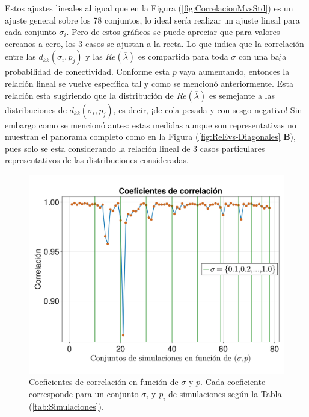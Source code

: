 \documentclass[a4paper,11pt]{book}
\theoremstyle{plain}
\theoremstyle{definition}
\begin{document}
Estos ajustes lineales al igual que en la Figura (\ref{fig:CorrelacionMvsStd}) es un ajuste general sobre los 78 conjuntos, lo ideal sería realizar un ajuste lineal para cada conjunto $\sigma_i$. Pero de estos gráficos se puede apreciar que para valores cercanos a cero, los 3 casos se ajustan a la recta. Lo que indica que la correlación entre las $d_{kk}(\sigma_i,p_j)$ y las $Re(\overline{\lambda})$ es compartida para toda $\sigma$ con una baja probabilidad de conectividad. Conforme esta $p$ vaya aumentando, entonces la relación lineal se vuelve específica tal y como se mencionó anteriormente. Esta relación esta sugiriendo que la distribución de $Re(\overline{\lambda})$ es semejante a las distribuciones de $d_{kk}(\sigma_i,p_j)$, es decir, ¡de cola pesada y con sesgo negativo! Sin embargo como se mencionó antes: estas medidas aunque son representativas no muestran el panorama completo como en la Figura (\ref{fig:ReEvs-Diagonales} \textbf{B}), pues solo se esta considerando la relación lineal de 3 casos particulares representativos de las distribuciones consideradas. 
\begin{figure}[h!]
	\centering
	\includegraphics[scale=0.2]{../Imagenes/CoeficientesCorrelacion}
	\caption{Coeficientes de correlación en función de $\sigma$ y $p$. Cada coeficiente corresponde para un conjunto $\sigma_i$ y $p_i$ de simulaciones según la Tabla (\ref{tab:Simulaciones}).}
	\label{fig:CoeficientesCorrelacion}
\end{figure}
\end{document}

